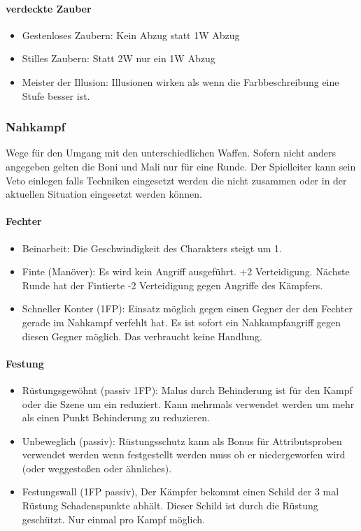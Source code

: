 \documentclass{article}
\begin{document}
\paragraph{verdeckte Zauber}

\begin{itemize}
\item Gestenloses Zaubern: Kein Abzug statt 1W Abzug
\item Stilles Zaubern: Statt 2W nur ein 1W Abzug
\item Meister der Illusion: Illusionen wirken als wenn die Farbbeschreibung eine Stufe besser ist.
\end{itemize}

\subsubsection{Nahkampf}

Wege für den Umgang mit den unterschiedlichen Waffen. Sofern nicht anders angegeben gelten die Boni und Mali nur für
eine Runde. Der Spielleiter kann sein Veto einlegen falls Techniken eingesetzt werden die nicht zusammen oder in der
aktuellen Situation eingesetzt werden können.

\paragraph{Fechter}

\begin{itemize}
\item Beinarbeit: Die Geschwindigkeit des Charakters steigt um 1.
\item Finte (Manöver): Es wird kein Angriff ausgeführt. +2 Verteidigung. Nächste Runde hat der Fintierte -2 Verteidigung gegen Angriffe des Kämpfers.
\item Schneller Konter (1FP): Einsatz möglich gegen einen Gegner der den Fechter gerade im Nahkampf verfehlt hat. Es ist sofort ein Nahkampfangriff gegen diesen Gegner möglich. Das verbraucht keine Handlung.
\end{itemize}

\paragraph{Festung}

\begin{itemize}
\item Rüstungsgewöhnt (passiv 1FP): Malus durch Behinderung ist für den Kampf oder die Szene um ein reduziert. Kann mehrmals verwendet werden um mehr als einen Punkt Behinderung zu reduzieren.
\item Unbeweglich (passiv): Rüstungsschutz kann als Bonus für Attributsproben verwendet werden wenn festgestellt werden muss ob er niedergeworfen wird (oder weggestoßen oder ähnliches).
\item Festungswall (1FP passiv), Der Kämpfer bekommt einen Schild der 3 mal Rüstung Schadenspunkte abhält. Dieser Schild ist durch die Rüstung geschützt. Nur einmal pro Kampf möglich.
\end{itemize}
\end{document}
